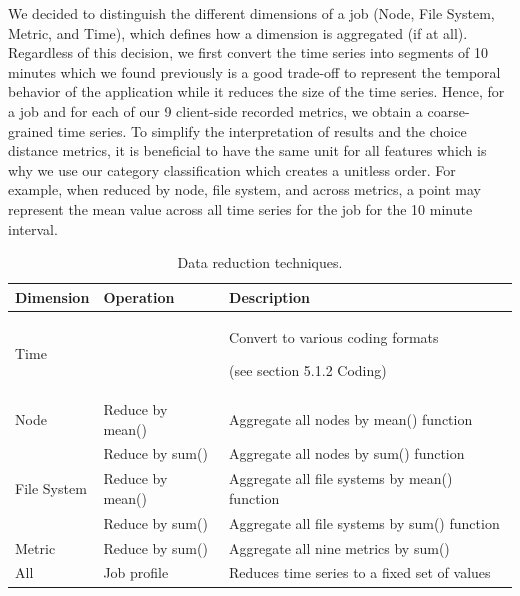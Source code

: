 \documentclass[]{llncs}
\begin{document}
We decided to distinguish the different dimensions of a job (Node, File System, Metric, and Time), which defines how a dimension is aggregated (if at all).
Regardless of this decision, we first convert the time series into segments of 10 minutes which we found previously is a good trade-off to represent the temporal behavior of the application while it reduces the size of the time series.
Hence, for a job and for each of our 9 client-side recorded metrics, we obtain a coarse-grained time series.
To simplify the interpretation of results and the choice distance metrics, it is beneficial to have the same unit for all features which is why we use our category classification which creates a unitless order.
For example, when reduced by node, file system, and across metrics, a point may represent the mean value across all time series for the job for the 10 minute interval.


\begin{table}
	\centering
	\begin{tabularx}{\textwidth}{llX}
		Dimension       & Operation                                    &  Description                                                       \\ 
		\hline
		Time            &                                              &  Convert to various coding formats \par (see section 5.1.2 Coding) \\ 
		\hline
		Node            & Reduce by mean()                             &  Aggregate all nodes by mean() function                            \\ 
		                & Reduce by sum()                              &  Aggregate all nodes by sum() function                             \\ 
		\hline
		File System     & Reduce by mean()                             &  Aggregate all file systems by mean() function                     \\ 
		                & 
		Reduce by sum() & Aggregate all file systems by sum() function \\ 
		\hline
		Metric          & Reduce by sum()                              &  Aggregate all nine metrics by sum()                               \\ 
		\hline
		All             & Job profile                                  &  Reduces time series to a fixed set of values                      \\ 
		\hline
	\end{tabularx}
	\caption{Data reduction techniques.}
	\label{tab:reduction_techniques}
\end{table}
\end{document}
